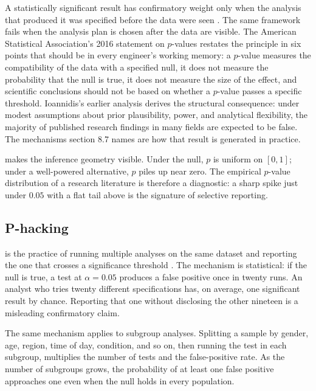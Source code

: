 A statistically significant result has confirmatory weight only
when the analysis that produced it was specified before the data
were seen \cite[ch.~10]{text:wasserman2004}. The same framework
fails when the analysis plan is chosen after the data are visible.
The American Statistical Association's 2016 statement on $p$-values
\cite{method:ch08-wasserstein-asa-2016} restates the principle in
six points that should be in every engineer's working memory: a
$p$-value measures the compatibility of the data with a specified
null, it does not measure the probability that the null is true,
it does not measure the size of the effect, and scientific
conclusions should not be based on whether a $p$-value passes a
specific threshold. Ioannidis's earlier analysis
\cite{method:ch08-ioannidis-2005} derives the structural
consequence: under modest assumptions about prior plausibility,
power, and analytical flexibility, the majority of published
research findings in many fields are expected to be false. The
mechanisms section 8.7 names are how that result is generated in
practice.

 makes the inference
geometry visible. Under the null, $p$ is uniform on $[0, 1]$; under
a well-powered alternative, $p$ piles up near zero. The empirical
$p$-value distribution of a research literature is therefore a
diagnostic: a sharp spike just under $0.05$ with a flat tail above
is the signature of selective reporting.



\subsection{P-hacking}

 is the practice of running multiple analyses on
the same dataset and reporting the one that crosses a significance
threshold \cite{method:simmons-nelson-simonsohn-2011}. The mechanism
is statistical: if the null is true, a test at $\alpha = 0.05$
produces a false positive once in twenty runs. An analyst who tries
twenty different specifications has, on average, one significant
result by chance. Reporting that one without disclosing the other
nineteen is a misleading confirmatory claim.

The same mechanism applies to subgroup analyses. Splitting a sample
by gender, age, region, time of day, condition, and so on, then
running the test in each subgroup, multiplies the number of tests
and the false-positive rate. As the number of subgroups grows, the
probability of at least one false positive approaches one even when
the null holds in every population.

